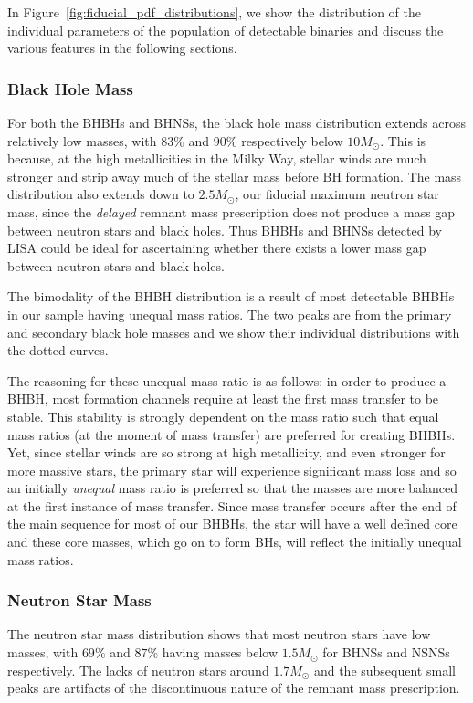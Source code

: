 In Figure~\ref{fig:fiducial_pdf_distributions}, we show the distribution of the individual parameters of the population of detectable binaries and discuss the various features in the following sections.

\subsubsection{Black Hole Mass}
For both the BHBHs and BHNSs, the black hole mass distribution extends across relatively low masses, with $83\%$ and $90\%$ respectively below $10 \unit{M_{\odot}}$. This is because, at the high metallicities in the Milky Way, stellar winds are much stronger and strip away much of the stellar mass before BH formation. The mass distribution also extends down to $2.5 \unit{M_{\odot}}$, our fiducial maximum neutron star mass, since the \citet{Fryer+2012} \textit{delayed} remnant mass prescription does not produce a mass gap between neutron stars and black holes. Thus BHBHs and BHNSs detected by LISA could be ideal for ascertaining whether there exists a lower mass gap between neutron stars and black holes.

The bimodality of the BHBH distribution is a result of most detectable BHBHs in our sample having unequal mass ratios. The two peaks are from the primary and secondary black hole masses and we show their individual distributions with the dotted curves.

The reasoning for these unequal mass ratio is as follows: in order to produce a BHBH, most formation channels require at least the first mass transfer to be stable. This stability is strongly dependent on the mass ratio such that equal mass ratios (at the moment of mass transfer) are preferred for creating BHBHs. Yet, since stellar winds are so strong at high metallicity, and even stronger for more massive stars, the primary star will experience significant mass loss and so an initially \textit{unequal} mass ratio is preferred so that the masses are more balanced at the first instance of mass transfer. Since mass transfer occurs after the end of the main sequence for most of our BHBHs, the star will have a well defined core and these core masses, which go on to form BHs, will reflect the initially unequal mass ratios.

\subsubsection{Neutron Star Mass}
The neutron star mass distribution shows that most neutron stars have low masses, with $69\%$ and $87\%$ having masses below $1.5 \unit{M_{\odot}}$ for BHNSs and NSNSs respectively. The lacks of neutron stars around $1.7 \unit{M_{\odot}}$ and the subsequent small peaks are artifacts of the discontinuous nature of the \citet{Fryer+2012} remnant mass prescription.

